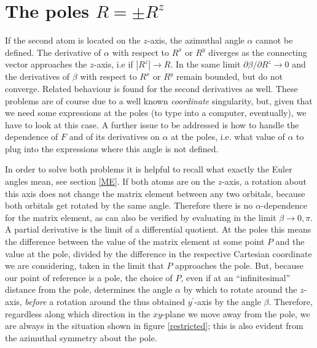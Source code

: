 \section{The poles $R=\pm R^{z}$}
\label{poles}
\par{If the second atom is located on the $z$-axis, the azimuthal angle $\alpha$ cannot be defined. The
derivative of $\alpha$ with respect to $R^{x}$ or $R^{y}$ diverges as the connecting vector approaches the
$z$-axis, i.e if $|R^{z}| \rightarrow R$. In the same limit $\partial\beta/\partial R^{z} \rightarrow 0$
and the derivatives of $\beta$ with respect to $R^{x}$ or $R^{y}$ remain bounded, but do not converge.
Related behaviour is found for the second derivatives as well.
These problems are of course due to a well known {\it coordinate} singularity, but, given that we need
some expressions at the poles (to type into a computer, eventually), we have to look at this case.
A further issue to be addressed is how to handle the dependence of $F$ and of its derivatives on $\alpha$
at the poles, i.e. what value of $\alpha$ to plug into the expressions where this angle is not defined.}
\par{In order to solve both problems it is helpful to recall what exactly the Euler angles mean, see section
\ref{ME}. If both atoms are on the $z$-axis, a rotation about this axis does not change the matrix element
between any two orbitals, because both orbitals get rotated by the same angle. Therefore there is no
$\alpha$-dependence for the matrix element, as can also be verified by evaluating  in the limit
$\beta \rightarrow 0,\pi$. A partial derivative is the limit of a differential quotient. At the poles
this means
the difference between the value of the matrix element at some point $P$ and the value at the pole,
divided by the difference in the respective Cartesian coordinate we are considering, taken in the limit that
$P$ approaches the pole. But, because our point of reference is a pole, the choice of $P$, even if at an
``infinitesimal'' distance from the pole, determines the angle $\alpha$ by which to rotate around the
$z$-axis, {\it before} a rotation around the thus obtained $y^{\prime}$-axis by the angle $\beta$.
Therefore, regardless along which direction in the $xy$-plane we move away from the pole, we are always in
the situation shown in figure \ref{restricted}; this is also evident from the azimuthal symmetry about the
pole.}
